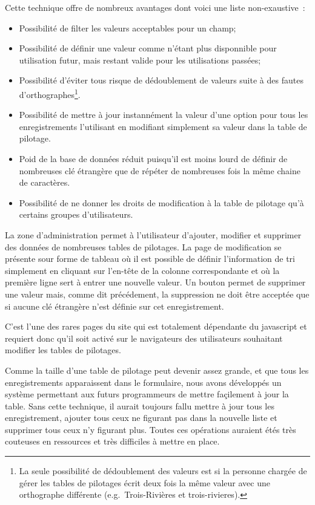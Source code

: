 \documentclass[letter, 11pt]{report}
\begin{document}
Cette technique offre de nombreux avantages dont voici une liste non-exaustive~:
\begin{itemize}
	\item Possibilité de filter les valeurs acceptables pour un champ;
	\item Possibilité de définir une valeur comme n'étant plus disponnible pour utilisation futur, mais restant valide pour les utilisations passées;
	\item Possibilité d'éviter tous risque de dédoublement de valeurs suite à des fautes d'orthographes\footnote{La seule possibilité de dédoublement des valeurs est si la personne chargée de gérer les tables de pilotages écrit deux fois la même valeur avec une orthographe différente (e.g.\ Trois-Rivières et trois-rivieres).}.
	\item Possibilité de mettre à jour instannément la valeur d'une option pour tous les enregistrements l'utilisant en modifiant simplement sa valeur dans la table de pilotage.
	\item Poid de la base de données réduit puisqu'il est moins lourd de définir de nombreuses clé étrangère que de répéter de nombreuses fois la même chaine de caractères.
	\item Possibilité de ne donner les droits de modification à la table de pilotage qu'à certains groupes d'utilisateurs.
\end{itemize}

La zone d'administration permet à l'utilisateur d'ajouter, modifier et supprimer des données de nombreuses tables de pilotages. La page de modification se présente sour forme de tableau où il est possible de définir l'information de tri simplement en cliquant sur l'en-tête de la colonne correspondante et où la première ligne sert à entrer une nouvelle valeur. Un bouton permet de supprimer une valeur mais, comme dit précédement, la suppression ne doit être acceptée que si aucune clé étrangère n'est définie sur cet enregistrement.

C'est l'une des rares pages du site qui est totalement dépendante du javascript et requiert donc qu'il soit activé sur le navigateurs des utilisateurs souhaitant modifier les tables de pilotages.

Comme la taille d'une table de pilotage peut devenir assez grande, et que tous les enregistrements apparaissent dans le formulaire, nous avons développés un système permettant aux futurs programmeurs de mettre façilement à jour la table. Sans cette technique, il aurait toujours fallu mettre à jour tous les enregistrement, ajouter tous ceux ne figurant pas dans la nouvelle liste et supprimer tous ceux n'y figurant plus. Toutes ces opérations auraient étés très couteuses en ressources et très difficiles à mettre en place.
\end{document}
